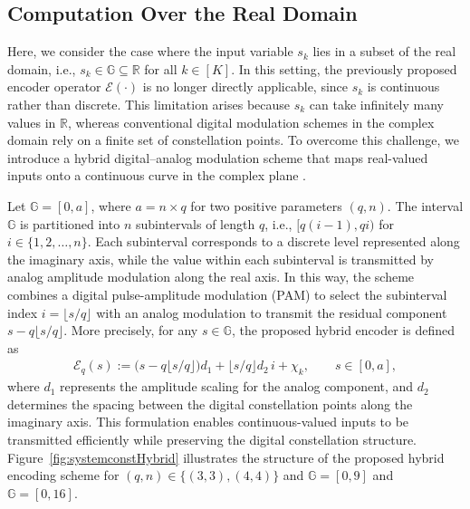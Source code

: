\documentclass[journal,12pt,onecolumn,draftclsnofoot]{IEEEtran}
\theoremstyle{definition}
\begin{document}
\subsection{Computation Over the Real Domain}\label{sec:hybrid}


Here, we consider the case where the input variable \( s_k \) lies in a subset of the real domain, i.e., \( s_k \in \mathbb{G} \subseteq \mathbb{R} \) for all \( k \in [K] \). In this setting, the previously proposed encoder operator \( \mathscr{E}(\cdot) \) is no longer directly applicable, since \( s_k \) is continuous rather than discrete.  This limitation arises because \( s_k \) can take infinitely many values in \( \mathbb{R} \), whereas conventional digital modulation schemes in the complex domain rely on a finite set of constellation points.  To overcome this challenge, we introduce a hybrid digital–analog modulation scheme that maps real-valued inputs onto a continuous curve in the complex plane \cite{skoglund2006hybrid}. 

Let \( \mathbb{G} = [0, a] \), where \( a = n \times q \) for two positive parameters \( (q, n) \). The interval \( \mathbb{G} \) is partitioned into \( n \) subintervals of length \( q \), i.e., \( [q(i-1), q i) \) for \( i \in \{1,2,\ldots,n\} \). Each subinterval corresponds to a discrete level represented along the imaginary axis, while the value within each subinterval is transmitted by analog amplitude modulation along the real axis. In this way, the scheme combines a digital pulse-amplitude modulation (PAM) to select the subinterval index \( i = \lfloor s/q \rfloor \) with an analog modulation to transmit the residual component \( s - q\lfloor s/q \rfloor \). More precisely, for any \( s \in \mathbb{G} \), the proposed hybrid encoder is defined as
\begin{align}
\label{eq:hybrid}
\mathscr{E}_q(s)
:= \big(s - q \lfloor s/q \rfloor \big)d_1
+ \lfloor s/q \rfloor d_2\,i + \chi_k, 
\qquad s \in [0, a],
\end{align}
where \( d_1 \) represents the amplitude scaling for the analog component, and \( d_2 \) determines the spacing between the digital constellation points along the imaginary axis. 
This formulation enables continuous-valued inputs to be transmitted efficiently while preserving the digital constellation structure.  Figure~\ref{fig:systemconstHybrid} illustrates the structure of the proposed hybrid encoding scheme for \( (q,n) \in \{(3,3),(4,4)\} \) and $\mathbb{G}=[0,9]$ and $\mathbb{G}=[0,16]$.
\end{document}
